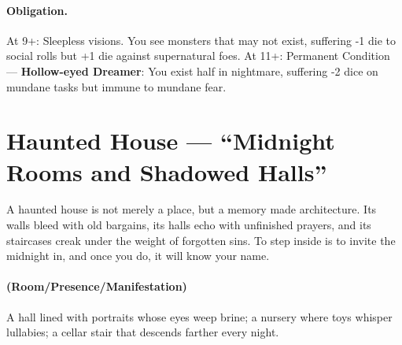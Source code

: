 \documentclass[11pt]{article}
\begin{document}
\paragraph{Obligation.}
At 9+: Sleepless visions. You see monsters that may not exist, suffering -1 die to social rolls but +1 die against supernatural foes.  
At 11+: Permanent Condition --- \textbf{Hollow-eyed Dreamer}: You exist half in nightmare, suffering -2 dice on mundane tasks but immune to mundane fear.

\section{Haunted House --- ``Midnight Rooms and Shadowed Halls''}
\label{chap:haunted-house}

\begin{tcolorbox}[colback=black!3,colframe=black!40!white,title={Theme \& Atmosphere},breakable]
A haunted house is not merely a place, but a memory made architecture. Its walls bleed with old bargains, its halls echo with unfinished prayers, and its staircases creak under the weight of forgotten sins. To step inside is to invite the midnight in, and once you do, it will know your name.
\end{tcolorbox}

\paragraph*{(Room/Presence/Manifestation)} A hall lined with portraits whose eyes weep brine; a nursery where toys whisper lullabies; a cellar stair that descends farther every night.
\end{document}
